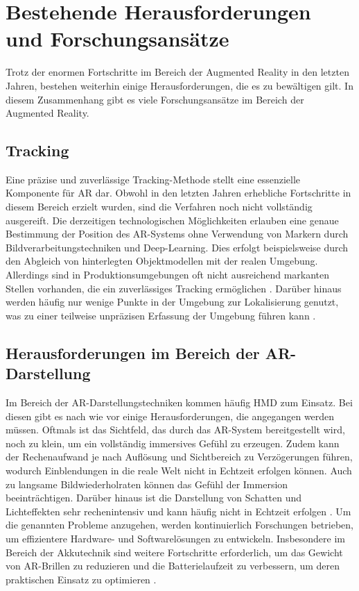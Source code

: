 \section{Bestehende Herausforderungen und Forschungsansätze}
Trotz der enormen Fortschritte im Bereich der Augmented Reality in den letzten
Jahren, bestehen weiterhin einige Herausforderungen, die es zu bewältigen gilt.
In diesem Zusammenhang gibt es viele Forschungsansätze im Bereich der Augmented
Reality.
\subsection{Tracking}
Eine präzise und zuverlässige Tracking-Methode stellt eine essenzielle
Komponente für AR dar. Obwohl in den letzten Jahren erhebliche Fortschritte in
diesem Bereich erzielt wurden, sind die Verfahren noch nicht vollständig
ausgereift. Die derzeitigen technologischen Möglichkeiten erlauben eine genaue
Bestimmung der Position des AR-Systems ohne Verwendung von Markern durch
Bildverarbeitungstechniken und Deep-Learning. Dies erfolgt beispielsweise durch
den Abgleich von hinterlegten Objektmodellen mit der realen
Umgebung.\cite{7907444} Allerdings sind in Produktionsumgebungen oft nicht
ausreichend markanten Stellen vorhanden, die ein zuverlässiges Tracking
ermöglichen \cite{devagiri2022augmented}. Darüber hinaus werden häufig nur
wenige Punkte in der Umgebung zur Lokalisierung genutzt, was zu einer teilweise
unpräzisen Erfassung der Umgebung führen kann \cite{chen2019design}.

\subsection{Herausforderungen im Bereich der AR-Darstellung}

Im Bereich der AR-Darstellungstechniken kommen häufig HMD zum Einsatz. Bei
diesen gibt es nach wie vor einige Herausforderungen, die angegangen werden
müssen. Oftmals ist das Sichtfeld, das durch das AR-System bereitgestellt wird,
noch zu klein, um ein vollständig immersives Gefühl zu erzeugen. Zudem kann der
Rechenaufwand je nach Auflösung und Sichtbereich zu Verzögerungen führen,
wodurch Einblendungen in die reale Welt nicht in Echtzeit erfolgen können. Auch
zu langsame Bildwiederholraten können das Gefühl der Immersion beeinträchtigen.
Darüber hinaus ist die Darstellung von Schatten und Lichteffekten sehr
rechenintensiv und kann häufig nicht in Echtzeit erfolgen
\cite{zhao2020pointar}. Um die genannten Probleme anzugehen, werden
kontinuierlich Forschungen betrieben, um effizientere Hardware- und
Softwarelösungen zu entwickeln. Insbesondere im Bereich der Akkutechnik sind
weitere Fortschritte erforderlich, um das Gewicht von AR-Brillen zu reduzieren
und die Batterielaufzeit zu verbessern, um deren praktischen Einsatz zu
optimieren \cite{arena2022overview}.


